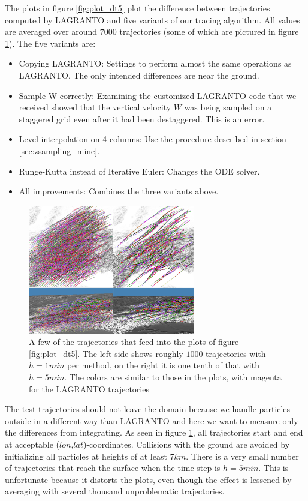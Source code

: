The plots in figure \ref{fig:plot_dt5} plot the difference between trajectories computed by LAGRANTO and five variants of our tracing algorithm. All values are averaged over around $7000$ trajectories (some of which are pictured in figure \ref{fig:traj_for_plot}). The five variants are:
\begin{itemize}
\item Copying LAGRANTO: Settings to perform almost the same operations as LAGRANTO. The only intended differences are near the ground.
\item Sample W correctly: Examining the customized LAGRANTO code that we received showed that the vertical velocity $W$ was being sampled on a staggered grid even after it had been destaggered. This is an error.
\item Level interpolation on 4 columns: Use the procedure described in section \ref{sec:zsampling_mine}.
\item Runge-Kutta instead of Iterative Euler: Changes the ODE solver.
\item All improvements: Combines the three variants above.
\end{itemize}

\begin{figure}
\centering \includegraphics*[width=0.65\textwidth]{figures/trajectories_for_plots}
\caption{A few of the trajectories that feed into the plots of figure \ref{fig:plot_dt5}. The left side shows roughly $1000$ trajectories with $h = 1 min$ per method, on the right it is one tenth of that with $h = 5 min$. The colors are similar to those in the plots, with magenta for the LAGRANTO trajectories}
\label{fig:traj_for_plot}
\end{figure}

The test trajectories should not leave the domain because we handle particles outside in a different way than LAGRANTO and here we want to measure only the differences from integrating. As seen in figure \ref{fig:traj_for_plot}, all trajectories start and end at acceptable ($lon$,$lat$)-coordinates. Collisions with the ground are avoided by initializing all particles at heights of at least $7 km$. There is a very small number of trajectories that reach the surface when the time step is $h = 5 min$. This is unfortunate because it distorts the plots, even though the effect is lessened by averaging with several thousand unproblematic trajectories.

